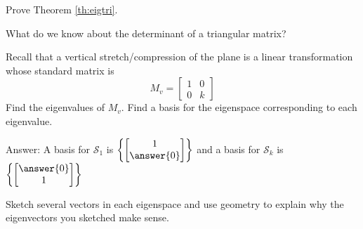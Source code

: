 \documentclass{ximera}
\begin{document}
\begin{problem}\label{prob:eigtri}
Prove Theorem \ref{th:eigtri}.  
\begin{hint}
    What do we know about the determinant of a triangular matrix?
\end{hint}

\end{problem}



\begin{problem}\label{prob:eigvectorstransfr2_1}
Recall that a vertical stretch/compression of the plane is a linear transformation whose standard matrix is $$M_v=\begin{bmatrix}1&0\\0&k\end{bmatrix}$$
Find the eigenvalues of $M_v$.  Find a basis for the eigenspace corresponding to each eigenvalue.

Answer:  A basis for $\mathcal{S}_1$ is $\left\{\begin{bmatrix}1\\\answer{0}\end{bmatrix}\right\}$
and a basis for $\mathcal{S}_k$ is $\left\{\begin{bmatrix}\answer{0}\\1\end{bmatrix}\right\}$

Sketch several vectors in each eigenspace and use geometry to explain why the eigenvectors you sketched make sense.
\end{problem}
\end{document}
